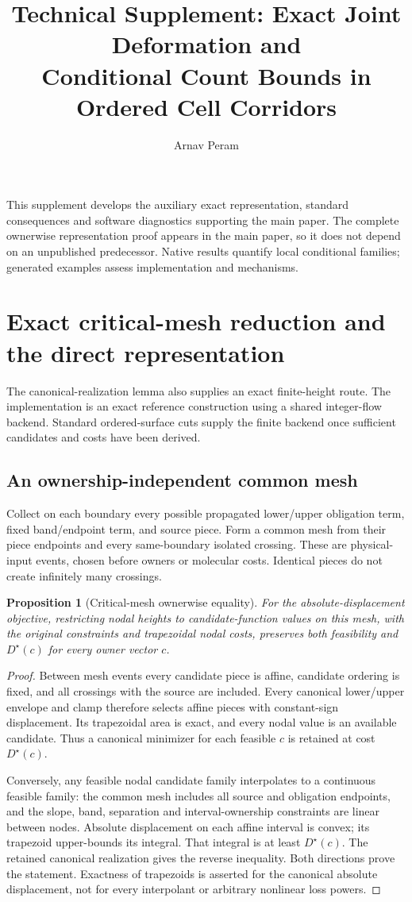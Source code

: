 \documentclass[10pt,letterpaper]{article}
\title{Technical Supplement: Exact Joint Deformation and\\ Conditional Count Bounds in Ordered Cell Corridors}
\author{Arnav Peram}\date{}
\newtheorem{proposition}[theorem]{Proposition}
\begin{document}
\maketitle
This supplement develops the auxiliary exact representation, standard consequences and software diagnostics supporting the main paper. The complete ownerwise representation proof appears in the main paper, so it does not depend on an unpublished predecessor. Native results quantify local conditional families; generated examples assess implementation and mechanisms.
\section{Exact critical-mesh reduction and the direct representation}
The canonical-realization lemma also supplies an exact finite-height route. The implementation is an exact reference construction using a shared integer-flow backend. Standard ordered-surface cuts supply the finite backend once sufficient candidates and costs have been derived.

\subsection{An ownership-independent common mesh}
Collect on each boundary every possible propagated lower/upper obligation term, fixed band/endpoint term, and source piece. Form a common mesh from their piece endpoints and every same-boundary isolated crossing. These are physical-input events, chosen before owners or molecular costs. Identical pieces do not create infinitely many crossings.

\begin{proposition}[Critical-mesh ownerwise equality]
For the absolute-displacement objective, restricting nodal heights to candidate-function values on this mesh, with the original constraints and trapezoidal nodal costs, preserves both feasibility and $D^\star(c)$ for every owner vector $c$.
\end{proposition}
\begin{proof}
Between mesh events every candidate piece is affine, candidate ordering is fixed, and all crossings with the source are included. Every canonical lower/upper envelope and clamp therefore selects affine pieces with constant-sign displacement. Its trapezoidal area is exact, and every nodal value is an available candidate. Thus a canonical minimizer for each feasible $c$ is retained at cost $D^\star(c)$.

Conversely, any feasible nodal candidate family interpolates to a continuous feasible family: the common mesh includes all source and obligation endpoints, and the slope, band, separation and interval-ownership constraints are linear between nodes. Absolute displacement on each affine interval is convex; its trapezoid upper-bounds its integral. That integral is at least $D^\star(c)$. The retained canonical realization gives the reverse inequality. Both directions prove the statement. Exactness of trapezoids is asserted for the canonical absolute displacement, not for every interpolant or arbitrary nonlinear loss powers.
\end{proof}
\end{document}
